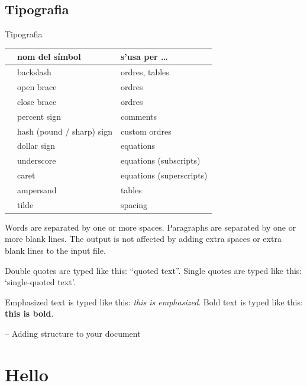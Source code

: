 


\subsection{Tipografia}
\begin{frame}{Tipografia}
\begin{tabular}{lll}
& nom del símbol & s'usa per \dots \\\hline
\bftt{\bs} & backslash                 & ordres, tables \\
\bftt{\{}  & open brace                & ordres \\
\bftt{\}}  & close brace               & ordres \\
\bftt{\%}  & percent sign              & comments \\
\bftt{\#}  & hash (pound / sharp) sign & custom ordres \\
\bftt{\$}  & dollar sign               & equations \\
\bftt{\_}  & underscore                & equations (subscripts) \\
\bftt{\^}  & caret                     & equations (superscripts) \\
\bftt{\&}  & ampersand                 & tables \\
\bftt{\~}  & tilde                     & spacing \\
\end{tabular}
\end{frame}


Words are separated by one or more spaces.  Paragraphs are separated by
one or more blank lines.  The output is not affected by adding extra
spaces or extra blank lines to the input file.

Double quotes are typed like this: ``quoted text''.
Single quotes are typed like this: `single-quoted text'.

Emphasized text is typed like this: \emph{this is emphasized}.
Bold       text is typed like this: \textbf{this is bold}.

-- Adding structure to your document

\section{Hello}

